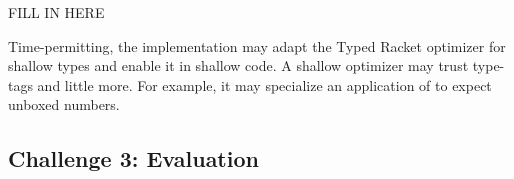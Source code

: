 
FILL IN HERE

Time-permitting, the implementation may adapt the Typed Racket optimizer for shallow types and enable it in shallow code.
A shallow optimizer may trust type-tags and little more.
For example, it may specialize an application of \racketcode{+} to expect unboxed numbers.


\subsection{Challenge 3: Evaluation}


